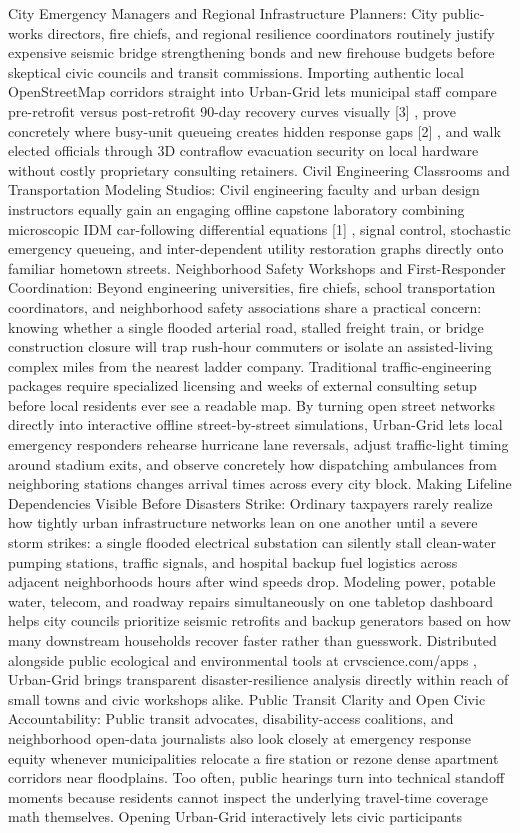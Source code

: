 \documentclass[10pt,letterpaper]{article}
\begin{document}
City Emergency Managers and Regional Infrastructure Planners: City public-works directors, fire chiefs, and regional resilience coordinators routinely justify expensive seismic bridge strengthening bonds and new firehouse budgets before skeptical civic councils and transit commissions. Importing authentic local OpenStreetMap corridors straight into Urban-Grid lets municipal staff compare pre-retrofit versus post-retrofit 90-day recovery curves visually [3] , prove concretely where busy-unit queueing creates hidden response gaps [2] , and walk elected officials through 3D contraflow evacuation security on local hardware without costly proprietary consulting retainers. Civil Engineering Classrooms and Transportation Modeling Studios: Civil engineering faculty and urban design instructors equally gain an engaging offline capstone laboratory combining microscopic IDM car-following differential equations [1] , signal control, stochastic emergency queueing, and inter-dependent utility restoration graphs directly onto familiar hometown streets. Neighborhood Safety Workshops and First-Responder Coordination: Beyond engineering universities, fire chiefs, school transportation coordinators, and neighborhood safety associations share a practical concern: knowing whether a single flooded arterial road, stalled freight train, or bridge construction closure will trap rush-hour commuters or isolate an assisted-living complex miles from the nearest ladder company. Traditional traffic-engineering packages require specialized licensing and weeks of external consulting setup before local residents ever see a readable map. By turning open street networks directly into interactive offline street-by-street simulations, Urban-Grid lets local emergency responders rehearse hurricane lane reversals, adjust traffic-light timing around stadium exits, and observe concretely how dispatching ambulances from neighboring stations changes arrival times across every city block. Making Lifeline Dependencies Visible Before Disasters Strike: Ordinary taxpayers rarely realize how tightly urban infrastructure networks lean on one another until a severe storm strikes: a single flooded electrical substation can silently stall clean-water pumping stations, traffic signals, and hospital backup fuel logistics across adjacent neighborhoods hours after wind speeds drop. Modeling power, potable water, telecom, and roadway repairs simultaneously on one tabletop dashboard helps city councils prioritize seismic retrofits and backup generators based on how many downstream households recover faster rather than guesswork. Distributed alongside public ecological and environmental tools at crvscience.com/apps , Urban-Grid brings transparent disaster-resilience analysis directly within reach of small towns and civic workshops alike. Public Transit Clarity and Open Civic Accountability: Public transit advocates, disability-access coalitions, and neighborhood open-data journalists also look closely at emergency response equity whenever municipalities relocate a fire station or rezone dense apartment corridors near floodplains. Too often, public hearings turn into technical standoff moments because residents cannot inspect the underlying travel-time coverage math themselves. Opening Urban-Grid interactively lets civic participants 
\end{document}
